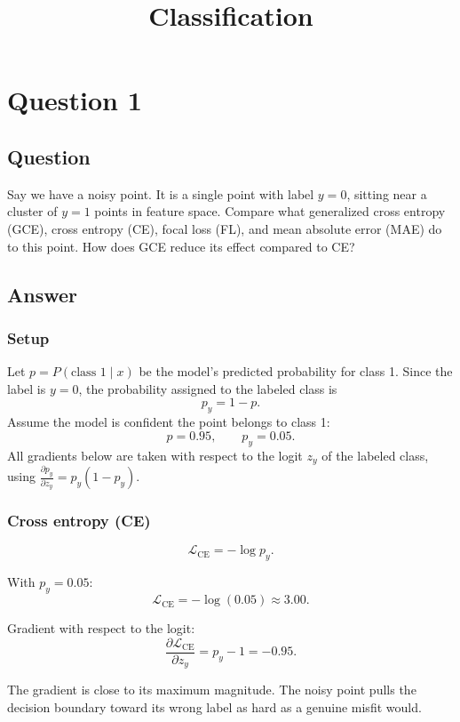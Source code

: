 \documentclass[11pt]{article}
\title{Classification}
\author{}
\date{}
\begin{document}
\maketitle

\section*{Question 1}

\subsection*{Question}

Say we have a noisy point. It is a single point with label $y = 0$, sitting near a cluster of $y = 1$ points in feature space. Compare what generalized cross entropy (GCE), cross entropy (CE), focal loss (FL), and mean absolute error (MAE) do to this point. How does GCE reduce its effect compared to CE?

\subsection*{Answer}

\subsubsection*{Setup}

Let $p = P(\text{class } 1 \mid x)$ be the model's predicted probability for class 1. Since the label is $y = 0$, the probability assigned to the labeled class is
\[
p_y = 1 - p.
\]
Assume the model is confident the point belongs to class 1:
\[
p = 0.95, \qquad p_y = 0.05.
\]
All gradients below are taken with respect to the logit $z_y$ of the labeled class, using $\frac{\partial p_y}{\partial z_y} = p_y(1-p_y)$.

\subsubsection*{Cross entropy (CE)}

\[
\mathcal{L}_{\mathrm{CE}} = -\log p_y.
\]

With $p_y = 0.05$:
\[
\mathcal{L}_{\mathrm{CE}} = -\log(0.05) \approx 3.00.
\]

Gradient with respect to the logit:
\[
\frac{\partial \mathcal{L}_{\mathrm{CE}}}{\partial z_y} = p_y - 1 = -0.95.
\]

The gradient is close to its maximum magnitude. The noisy point pulls the decision boundary toward its wrong label as hard as a genuine misfit would.
\end{document}
